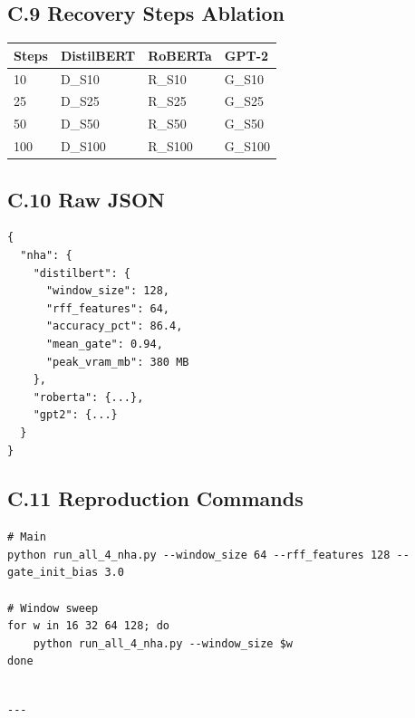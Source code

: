 \subsection{C.9 Recovery Steps Ablation}

\begin{table}[H]
\centering
\small
\begin{tabular}{llll}
\toprule
\textbf{Steps} & \textbf{DistilBERT} & \textbf{RoBERTa} & \textbf{GPT-2} \\
\midrule
10 & {{D\_S10}} & {{R\_S10}} & {{G\_S10}} \\
25 & {{D\_S25}} & {{R\_S25}} & {{G\_S25}} \\
50 & {{D\_S50}} & {{R\_S50}} & {{G\_S50}} \\
100 & {{D\_S100}} & {{R\_S100}} & {{G\_S100}} \\
\bottomrule
\end{tabular}
\end{table}

\subsection{C.10 Raw JSON}

\begin{lstlisting}
{
  "nha": {
    "distilbert": {
      "window_size": 128,
      "rff_features": 64,
      "accuracy_pct": 86.4,
      "mean_gate": 0.94,
      "peak_vram_mb": 380 MB
    },
    "roberta": {...},
    "gpt2": {...}
  }
}
\end{lstlisting}

\subsection{C.11 Reproduction Commands}

\begin{lstlisting}
# Main
python run_all_4_nha.py --window_size 64 --rff_features 128 --gate_init_bias 3.0

# Window sweep
for w in 16 32 64 128; do
    python run_all_4_nha.py --window_size $w
done
\end{lstlisting}
\begin{lstlisting}

---
\end{lstlisting}